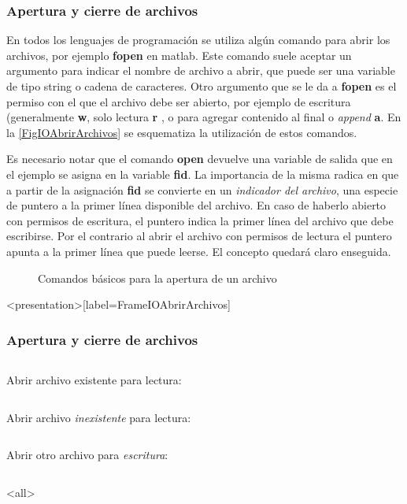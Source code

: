 \subsubsection{Apertura y cierre de archivos}

En todos los lenguajes de programación se utiliza algún comando
para abrir los archivos, por ejemplo \textbf{fopen} en matlab.
Este comando suele aceptar un argumento para indicar el
nombre de archivo a abrir, que puede ser una variable 
de tipo string o cadena de caracteres. Otro argumento
que se le da a \textbf{fopen} es el permiso con el 
que el archivo debe ser abierto, por ejemplo
de escritura (generalmente \textbf{w}, solo lectura \textbf{r}
, o para agregar contenido al final o \emph{append} \textbf{a}. 
En la  \autoref{FigIOAbrirArchivos} se esquematiza
la utilización de estos comandos. 

Es necesario notar que el comando \textbf{open} devuelve
una variable de salida que en el ejemplo se asigna 
en la variable \textbf{fid}. 
La importancia de la misma radica en que a partir
de la asignación \textbf{fid} se convierte en 
un \emph{indicador del archivo}, una especie de puntero
a la primer línea disponible del archivo. En caso
de haberlo abierto con permisos de escritura, 
el puntero indica la primer línea del 
archivo que debe escribirse. Por el contrario
al abrir el archivo con permisos de lectura
el puntero apunta a la primer
línea que puede leerse. El concepto quedará 
claro enseguida. 

\begin{figure}
\caption{Comandos básicos para la apertura de un archivo\label{FigIOAbrirArchivos}}
\end{figure}

\mode*

\begin{frame}<presentation>[label=FrameIOAbrirArchivos]
\frametitle{Apertura y cierre de archivos}

\begin{columns}[T]
\hfill Abrir archivo existente para lectura:
\begin{codeblock}

\end{codeblock}
\end{columns}

\begin{columns}[T]
\hfill Abrir archivo \emph{inexistente} para lectura:
\begin{codeblock}

\end{codeblock}
\end{columns}

\begin{columns}[T]
\hfill Abrir otro archivo  para \emph{escritura}:
\begin{codeblock}

\end{codeblock}
\end{columns}

\end{frame}

\mode<all>
